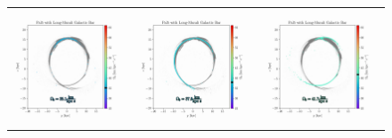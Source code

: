 \begin{figure}
\begin{tabular}{ccc}
                    \includegraphics[width=.32\linewidth]{images/frame_0038.png}&
                    \includegraphics[width=.32\linewidth]{images/frame_0048.png}&
                    \includegraphics[width=.32\linewidth]{images/frame_0062.png}\\
                    

\end{tabular}
\end{figure}

